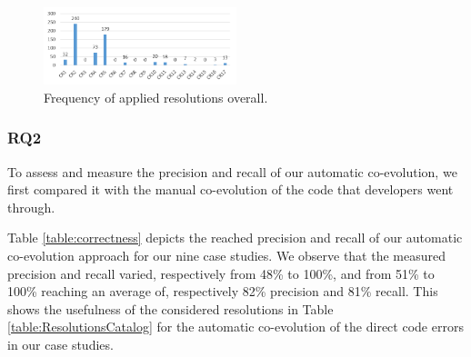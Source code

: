 	
	
	\begin{figure}
	\includegraphics[width=0.5\textwidth]{./pics/chapter1pics/FrequencyICSE.png}
	\caption{Frequency of applied resolutions overall.}
	\label{fig:frequency_resolutions}
	\end{figure}
	
	
	\subsubsection{RQ2}
	
	To assess and measure the precision and recall of our automatic co-evolution, we first compared it with the manual co-evolution of the code that developers went through. 
	
	Table \ref{table:correctness} depicts the reached precision and recall of our automatic co-evolution approach for our nine case studies. We observe that the measured precision and recall varied, respectively from 48\% to 100\%, and from 51\% to 100\% reaching an average of, respectively 82\% precision and 81\% recall. 
	This shows the usefulness of the considered resolutions in Table \ref{table:ResolutionsCatalog} for the automatic co-evolution of the direct code errors in our case studies. %
	
